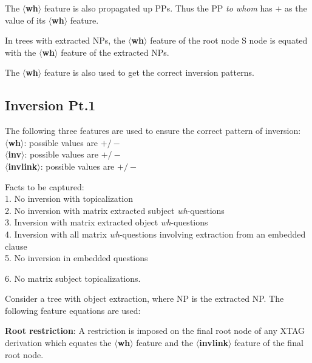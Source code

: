 The {\bf $\langle$wh$\rangle$} feature
is also propagated up PPs. Thus the PP {\em to whom} has $+$ as the value of its 
{\bf $\langle$wh$\rangle$} feature. 

In trees with extracted NPs, the {\bf $\langle$wh$\rangle$} feature of the
root node S node is equated with the {\bf $\langle$wh$\rangle$} feature
of the extracted NPs. 

The {\bf $\langle$wh$\rangle$} feature is also used to get the correct
inversion patterns.

\subsection{Inversion Pt.1}
The following three features are used to ensure the correct pattern of
inversion:\\
{\bf $\langle$wh$\rangle$}: possible values are {\bf $+/-$}\\
{\bf $\langle$inv$\rangle$}: possible values are {\bf $+/-$}\\
{\bf $\langle$invlink$\rangle$}: possible values are {\bf $+/-$}

Facts to be captured:\\
1. No inversion with topicalization\\
2. No inversion with matrix extracted subject {\em wh}-questions\\
3. Inversion with matrix extracted object {\em wh}-questions\\
4. Inversion with all matrix {\em wh}-questions involving extraction from an
embedded clause\\
5. No inversion in embedded questions

6. No matrix subject topicalizations.

Consider a tree with object extraction, where NP is the extracted NP. 
The following feature equations are used:\\


{\bf Root restriction}: A restriction is imposed on the final root node 
of any XTAG derivation which equates the {\bf $\langle$wh$\rangle$}
feature and the {\bf $\langle$invlink$\rangle$} feature of the final
root node. 

